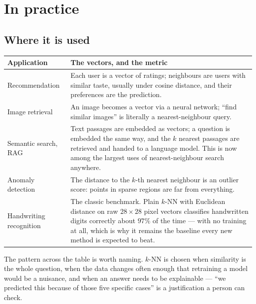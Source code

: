 \documentclass[11pt]{article}
\theoremstyle{plain}
\theoremstyle{definition}
\theoremstyle{remark}
\begin{document}
\section{In practice}
\subsection{Where it is used}
\begin{center}
\renewcommand{\arraystretch}{1.4}
\begin{tabular}{@{}l >{\raggedright\arraybackslash}p{9.4cm}@{}}
\toprule
\textbf{Application} & \textbf{The vectors, and the metric} \\
\midrule
Recommendation
  & Each user is a vector of ratings; neighbours are users with similar taste,
    usually under cosine distance, and their preferences are the prediction. \\
Image retrieval
  & An image becomes a vector via a neural network; ``find similar images'' is
    literally a nearest-neighbour query. \\
Semantic search, RAG
  & Text passages are embedded as vectors; a question is embedded the same way,
    and the $k$ nearest passages are retrieved and handed to a language model.
    This is now among the largest uses of nearest-neighbour search anywhere. \\
Anomaly detection
  & The distance to the $k$-th nearest neighbour is an outlier score: points in
    sparse regions are far from everything. \\
Handwriting recognition
  & The classic benchmark. Plain $k$-NN with Euclidean distance on raw
    $28\times28$ pixel vectors classifies handwritten digits correctly about
    $97\%$ of the time --- with no training at all, which is why it remains the
    baseline every new method is expected to beat. \\
\bottomrule
\end{tabular}
\end{center}

\noindent The pattern across the table is worth naming. $k$-NN is chosen when
similarity is the whole question, when the data changes often enough that
retraining a model would be a nuisance, and when an answer needs to be
explainable --- ``we predicted this because of those five specific cases'' is a
justification a person can check.
\end{document}
